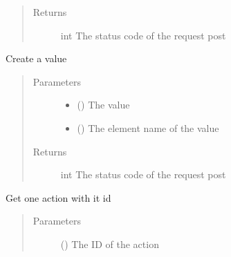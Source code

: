 \documentclass[letterpaper,10pt,english]{sphinxmanual}
\begin{document}
\begin{fulllineitems}
\begin{fulllineitems}
\begin{quote}
\begin{description}
\item[{Returns}] \leavevmode
\sphinxAtStartPar
int \textendash{} The status code of the request post

\end{description}\end{quote}

\end{fulllineitems}


\begin{fulllineitems}
\label{\detokenize{index:Api.Api.create_value}}
\sphinxAtStartPar
Create a value
\begin{quote}\begin{description}
\item[{Parameters}] \leavevmode\begin{itemize}
\item {} 
\sphinxAtStartPar
{} () \textendash{} The value

\item {} 
\sphinxAtStartPar
{} () \textendash{} The element name of the value

\end{itemize}

\item[{Returns}] \leavevmode
\sphinxAtStartPar
int \textendash{} The status code of the request post

\end{description}\end{quote}

\end{fulllineitems}


\begin{fulllineitems}
\label{\detokenize{index:Api.Api.get_action_by_id}}
\sphinxAtStartPar
Get one action with it id
\begin{quote}\begin{description}
\item[{Parameters}] \leavevmode
\sphinxAtStartPar
{} () \textendash{} The ID of the action


\end{description}
\end{quote}
\end{fulllineitems}
\end{fulllineitems}
\end{document}
